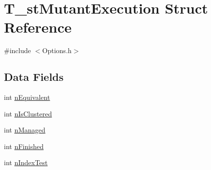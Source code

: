 \hypertarget{structT__stMutantExecution}{\section{T\-\_\-st\-Mutant\-Execution Struct Reference}
\label{structT__stMutantExecution}
}


{\ttfamily \#include $<$Options.\-h$>$}

\subsection*{Data Fields}
\begin{DoxyCompactItemize}
\item 
int \hyperlink{structT__stMutantExecution_aad0159845c8a654cec6e68c0887be609}{n\-Equivalent}
\item 
int \hyperlink{structT__stMutantExecution_a892cc030241593320f55fbabfa060679}{n\-Is\-Clustered}
\item 
int \hyperlink{structT__stMutantExecution_a3bd80a5e3e6c5cf647a62dfb0b694bcf}{n\-Managed}
\item 
int \hyperlink{structT__stMutantExecution_a56ecf18ce5bc925a81abd45096ccc155}{n\-Finished}
\item 
int \hyperlink{structT__stMutantExecution_a8cbb62d7c67ff6a7c0e09ddd0f1e87ca}{n\-Index\-Test}
\end{DoxyCompactItemize}


